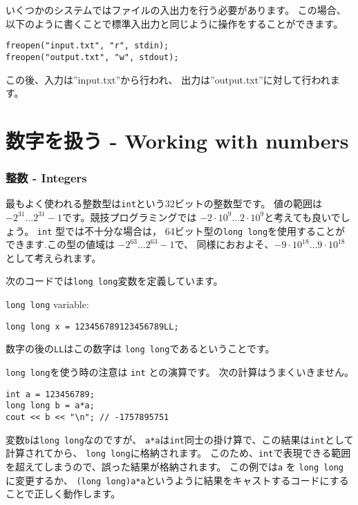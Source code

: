 いくつかのシステムではファイルの入出力を行う必要があります。
この場合、以下のように書くことで標準入出力と同じように操作をすることができます。
\begin{lstlisting}
freopen("input.txt", "r", stdin);
freopen("output.txt", "w", stdout);
\end{lstlisting}
この後、入力は''input.txt''から行われ、
出力は''output.txt''に対して行われます。

\section{数字を扱う - Working with numbers}


\subsubsection{整数 - Integers}

最もよく使われる整数型は\texttt{int}という32ビットの整数型です。
値の範囲は$-2^{31} \ldots 2^{31}-1$です。競技プログラミングでは
$-2 \cdot 10^9 \ldots 2 \cdot 10^9$と考えても良いでしょう。
\texttt{int} 型では不十分な場合は， 
64ビット型の\texttt{long long}を使用することができます.この型の値域は
$-2^{63} \ldots 2^{63}-1$で、
同様におおよそ、$-9 \cdot 10^{18} \ldots 9 \cdot 10^{18}$として考えられます。

次のコードでは\texttt{long long}変数を定義しています。

\texttt{long long} variable:
\begin{lstlisting}
long long x = 123456789123456789LL;
\end{lstlisting}
数字の後の\texttt{LL}はこの数字は
\texttt{long long}であるということです。

\texttt{long long}を使う時の注意は
\texttt{int} との演算です。
次の計算はうまくいきません。

\begin{lstlisting}
int a = 123456789;
long long b = a*a;
cout << b << "\n"; // -1757895751
\end{lstlisting}

変数\texttt{b}は\texttt{long long}なのですが、
\texttt{a*a}は\texttt{int}同士の掛け算で、この結果は\texttt{int}として計算されてから、
\texttt{long long}に格納されます。
このため、\texttt{int}で表現できる範囲を超えてしまうので、誤った結果が格納されます。
この例では\texttt{a} を \texttt{long long} に変更するか、
\texttt{(long long)a*a}というように結果をキャストするコードにすることで正しく動作します。

